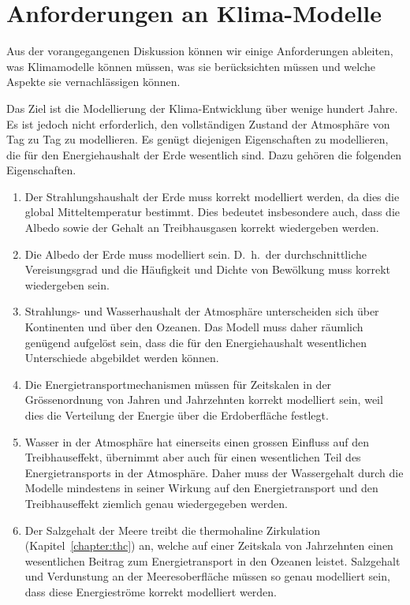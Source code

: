 %
%
%

\section{Anforderungen an Klima-Modelle\label{section:anforderungen}}
Aus der vorangegangenen Diskussion können wir einige Anforderungen
ableiten, was Klimamodelle können müssen, was sie berücksichten
müssen und welche Aspekte sie vernachlässigen können.

Das Ziel ist die Modellierung der Klima-Entwicklung über wenige
hundert Jahre.
Es ist jedoch nicht erforderlich, den vollständigen Zustand der
Atmosphäre von Tag zu Tag zu modellieren.
Es genügt diejenigen Eigenschaften zu modellieren, die 
für den Energiehaushalt der Erde wesentlich sind.
Dazu gehören die folgenden Eigenschaften.
\begin{enumerate}
\item
Der Strahlungshaushalt der Erde muss korrekt modelliert werden,
da dies die global Mitteltemperatur bestimmt.
Dies bedeutet insbesondere auch, dass die Albedo sowie der Gehalt an
Treibhausgasen korrekt wiedergeben werden.
\item
Die Albedo der Erde muss modelliert sein. 
D.~h.~der durchschnittliche Vereisungsgrad und die Häufigkeit und
Dichte von Bewölkung muss korrekt wiedergeben sein.
\item
Strahlungs- und Wasserhaushalt der Atmosphäre unterscheiden sich
über Kontinenten und über den Ozeanen.
Das Modell muss daher räumlich genügend aufgelöst sein, dass die
für den Energiehaushalt wesentlichen Unterschiede abgebildet
werden können.
\item
Die Energietransportmechanismen müssen für Zeitskalen in der Grössenordnung
von Jahren und Jahrzehnten korrekt modelliert sein, weil dies die
Verteilung der Energie über die Erdoberfläche festlegt.
\item
Wasser in der Atmosphäre hat einerseits einen grossen Einfluss auf
den Treibhauseffekt, übernimmt aber auch für einen wesentlichen Teil
des Energietransports in der Atmosphäre.
Daher muss der Wassergehalt durch die Modelle mindestens in seiner
Wirkung auf den Energietransport und den Treibhauseffekt
ziemlich genau wiedergegeben werden.
\item
Der Salzgehalt der Meere treibt die thermohaline Zirkulation
(Kapitel~\ref{chapter:thc})
an, welche
auf einer Zeitskala von Jahrzehnten einen wesentlichen Beitrag zum
Energietransport in den Ozeanen leistet.
Salzgehalt und Verdunstung an der Meeresoberfläche müssen so genau
modelliert sein, dass diese Energieströme korrekt modelliert werden.
\end{enumerate}

